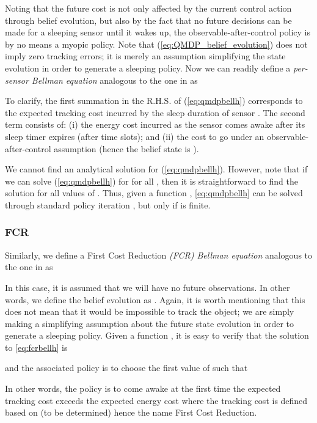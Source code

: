 \documentclass[journal,draftcls,onecolumn,11pt]{IEEEtran}
\newcommand{\QMDP}{}
\begin{document}
Noting that the future cost is not only affected by the current control action through belief evolution, but also by the fact that no future decisions can be made for a sleeping sensor until it wakes up, the observable-after-control policy is by no means a myopic policy. Note that (\ref{eq:QMDP_belief_evolution}) does not imply zero tracking errors; it is merely an assumption simplifying the state evolution in order to generate a sleeping policy. Now we can readily define a {\em \QMDP{} per-sensor Bellman equation} analogous to the one in \cite{fuemmeler08} as

To clarify, the first summation in the R.H.S. of (\ref{eq:qmdpbellh}) corresponds to the expected tracking cost incurred by the sleep duration  of sensor . The second term consists of: (i) the energy cost incurred as the sensor comes awake after its sleep timer expires (after  time slots); and (ii) the cost to go under an observable-after-control assumption (hence the belief state is ).

We cannot find an analytical solution for (\ref{eq:qmdpbellh}). However, note that if we can solve (\ref{eq:qmdpbellh}) for  for all , then it is straightforward to find the solution for all values of . Thus, given a function , \eqref{eq:qmdpbellh} can be solved through standard policy iteration \cite{bertsekas07}, but only if  is finite.

\subsubsection{FCR}
Similarly, we define a First Cost Reduction {\em (FCR) Bellman equation} analogous to the one in \cite{fuemmeler08} as

In this case, it is assumed that we will have no future observations. In other words, we define the belief evolution as . Again, it is worth mentioning that this does not mean that it would be impossible to track the object; we are simply making a simplifying assumption about the future state evolution in order to generate a sleeping policy. Given a function , it is easy to verify that the solution to \eqref{eq:fcrbellh} is

and the associated policy is to choose the first value of  such that

In other words, the policy is to come awake at the first time the expected tracking cost exceeds the expected energy cost where the tracking cost is defined based on  (to be determined) hence the name First Cost Reduction.
\end{document}

